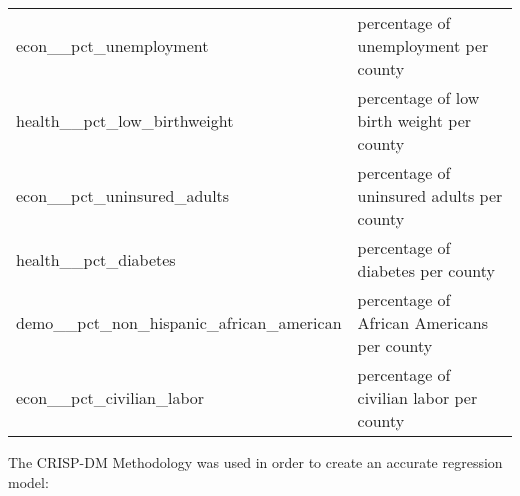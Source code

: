 \documentclass[11pt]{article}
\begin{document}
\begin{longtable}[]{@{}ll@{}}
\begin{minipage}[t]{0.71\columnwidth}
econ\_\_pct\_unemployment\strut
\end{minipage} & \begin{minipage}[t]{0.14\columnwidth}\raggedright\strut
percentage of unemployment per county\strut
\end{minipage}\tabularnewline
\begin{minipage}[t]{0.71\columnwidth}\raggedright\strut
health\_\_pct\_low\_birthweight\strut
\end{minipage} & \begin{minipage}[t]{0.14\columnwidth}\raggedright\strut
percentage of low birth weight per county\strut
\end{minipage}\tabularnewline
\begin{minipage}[t]{0.71\columnwidth}\raggedright\strut
econ\_\_pct\_uninsured\_adults\strut
\end{minipage} & \begin{minipage}[t]{0.14\columnwidth}\raggedright\strut
percentage of uninsured adults per county\strut
\end{minipage}\tabularnewline
\begin{minipage}[t]{0.71\columnwidth}\raggedright\strut
health\_\_pct\_diabetes\strut
\end{minipage} & \begin{minipage}[t]{0.14\columnwidth}\raggedright\strut
percentage of diabetes per county\strut
\end{minipage}\tabularnewline
\begin{minipage}[t]{0.71\columnwidth}\raggedright\strut
demo\_\_pct\_non\_hispanic\_african\_american\strut
\end{minipage} & \begin{minipage}[t]{0.14\columnwidth}\raggedright\strut
percentage of African Americans per county\strut
\end{minipage}\tabularnewline
\begin{minipage}[t]{0.71\columnwidth}\raggedright\strut
econ\_\_pct\_civilian\_labor\strut
\end{minipage} & \begin{minipage}[t]{0.14\columnwidth}\raggedright\strut
percentage of civilian labor per county\strut
\end{minipage}\tabularnewline
\bottomrule
\end{longtable}

The CRISP-DM Methodology was used in order to create an accurate
regression model:
\end{document}
